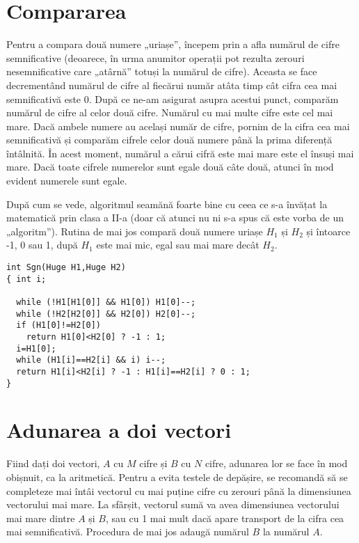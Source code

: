 \section{Compararea}

Pentru a compara două numere „uriașe”, începem prin a afla numărul de cifre
semnificative (deoarece, în urma anumitor operații pot rezulta zerouri
nesemnificative care „atârnă” totuși la numărul de cifre). Aceasta se face
decrementând numărul de cifre al fiecărui număr atâta timp cât cifra cea mai
semnificativă este 0. După ce ne-am asigurat asupra acestui punct, comparăm
numărul de cifre al celor două cifre. Numărul cu mai multe cifre este cel mai
mare. Dacă ambele numere au același număr de cifre, pornim de la cifra cea mai
semnificativă și comparăm cifrele celor două numere până la prima diferență
întâlnită. În acest moment, numărul a cărui cifră este mai mare este el însuși
mai mare. Dacă toate cifrele numerelor sunt egale două câte două, atunci în
mod evident numerele sunt egale.

După cum se vede, algoritmul seamănă foarte bine cu ceea ce s-a învățat la
matematică prin clasa a II-a (doar că atunci nu ni s-a spus că este vorba de
un „algoritm”). Rutina de mai jos compară două numere uriașe $H_1$ și $H_2$ și
întoarce -1, 0 sau 1, după $H_1$ este mai mic, egal sau mai mare decât $H_2$.

\begin{verbatim}
int Sgn(Huge H1,Huge H2)
{ int i;

  while (!H1[H1[0]] && H1[0]) H1[0]--;
  while (!H2[H2[0]] && H2[0]) H2[0]--;
  if (H1[0]!=H2[0])
    return H1[0]<H2[0] ? -1 : 1;
  i=H1[0];
  while (H1[i]==H2[i] && i) i--;
  return H1[i]<H2[i] ? -1 : H1[i]==H2[i] ? 0 : 1;
}
\end{verbatim}

\section{Adunarea a doi vectori}

Fiind dați doi vectori, $A$ cu $M$ cifre și $B$ cu $N$ cifre, adunarea lor se
face în mod obișnuit, ca la aritmetică. Pentru a evita testele de depășire, se
recomandă să se completeze mai întâi vectorul cu mai puține cifre cu zerouri
până la dimensiunea vectorului mai mare. La sfârșit, vectorul sumă va avea
dimensiunea vectorului mai mare dintre $A$ și $B$, sau cu 1 mai mult dacă
apare transport de la cifra cea mai semnificativă. Procedura de mai jos adaugă
numărul $B$ la numărul $A$.

